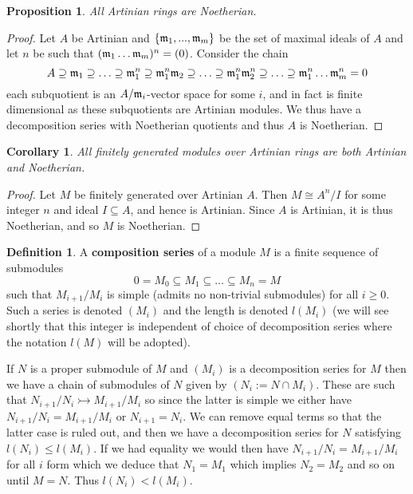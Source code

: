 \documentclass[12pt]{article}
\theoremstyle{plain}
\newtheorem{proposition}[thm]{Proposition}
\newtheorem{cor}[thm]{Corollary}
\theoremstyle{definition}
\newtheorem{defn}[thm]{Definition} %
\begin{document}
	\begin{proposition}
		All Artinian rings are Noetherian.
	\end{proposition}
	\begin{proof}
		Let $A$ be Artinian and $\lbrace \frak{m}_1,...,\frak{m}_m\rbrace$ be the set of maximal ideals of $A$ and let $n$ be such that $(\frak{m}_1\hdots\frak{m}_m)^n = (0)$. Consider the chain
		\[A \supseteq \frak{m}_1 \supseteq \hdots \supseteq \frak{m}_1^n \supseteq \frak{m}_1^n\frak{m}_2\supseteq\hdots\supseteq \frak{m}_1^n\frak{m}_2^n \supseteq \hdots \supseteq \frak{m}_1^n\hdots\frak{m}_m^n = 0\]
		each subquotient is an $A/\frak{m}_i$-vector space for some $i$, and in fact is finite dimensional as these subquotients are Artinian modules.  We thus have a decomposition series with Noetherian quotients and thus $A$ is Noetherian.
	\end{proof}
	\begin{cor}
		All finitely generated modules over Artinian rings are both Artinian and Noetherian.
	\end{cor}
	\begin{proof}
		Let $M$ be finitely generated over Artinian $A$. Then $M \cong A^n/I$ for some integer $n$ and ideal $I \subseteq A$, and hence is Artinian. Since $A$ is Artinian, it is thus Noetherian, and so $M$ is Noetherian.
	\end{proof}
	\begin{defn}
		A \textbf{composition series} of a module $M$ is a finite sequence of submodules
		\[0 = M_0 \subseteq M_1 \subseteq \hdots \subseteq M_n = M\]
		such that $M_{i+1}/M_{i}$ is simple (admits no non-trivial submodules) for all $i \geq 0$. Such a series is denoted $(M_i)$ and the length is denoted $l(M_i)$ (we will see shortly that this integer is independent of choice of decomposition series where the notation $l(M)$ will be adopted).
	\end{defn}
	If $N$ is a proper submodule of $M$ and $(M_i)$ is a decomposition series for $M$ then we have a chain of submodules of $N$ given by $(N_i := N \cap M_i)$. These are such that $N_{i+1}/N_{i} \rightarrowtail M_{i+1}/M_i$ so since the latter is simple we either have $N_{i+1}/N_i = M_{i+1}/M_i$ or $N_{i+1} = N_i$. We can remove equal terms so that the latter case is ruled out, and then we have a decomposition series for $N$ satisfying $l(N_i) \leq l(M_i)$. If we had equality we would then have $N_{i+1}/N_i = M_{i+1}/M_i$ for all $i$ form which we deduce that $N_1 = M_{1}$ which implies $N_2 = M_2$ and so on until $M = N$. Thus $l(N_i) < l(M_i)$.
	
\end{document}
